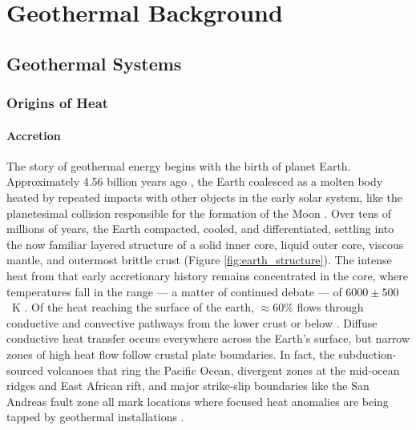 \chapter{Geothermal Background}\label{ch2:background}
\section{Geothermal Systems}\label{ch2:geosys}
\subsection{Origins of Heat}\label{ch2:heatorig}
\subsubsection{Accretion}\label{ch2:accrete}
The story of geothermal energy begins with the birth of planet Earth. Approximately 4.56 billion years ago \citep{allegre_age_1995, patterson_age_1956}, the Earth coalesced as a molten body heated by repeated impacts with other objects in the early solar system, like the planetesimal collision responsible for the formation of the Moon \citep{stevenson_origin_2014}. Over tens of millions of years, the Earth compacted, cooled, and differentiated, settling into the now familiar layered structure of a solid inner core, liquid outer core, viscous mantle, and outermost brittle crust \citep[p.\ 7]{press_understanding_2004} (Figure \ref{fig:earth_structure}). The intense heat from that early accretionary history remains concentrated in the core, where temperatures fall in the range --- a matter of continued debate --- of $6000\pm500$~K \citep[p.\ 372]{fowler_solid_2005}. Of the heat reaching the surface of the earth, $\approx 60\%$ flows through conductive and convective pathways from the lower crust or below \citep{stein_heat_1995}. Diffuse conductive heat transfer occurs everywhere across the Earth’s surface, but narrow zones of high heat flow follow crustal plate boundaries. In fact, the subduction-sourced volcanoes that ring the Pacific Ocean, divergent zones at the mid-ocean ridges and East African rift, and major strike-slip boundaries like the San Andreas fault zone all mark locations where focused heat anomalies are being tapped by geothermal installations \citep[p.\ 16]{dipippo_geothermal_2012}.

